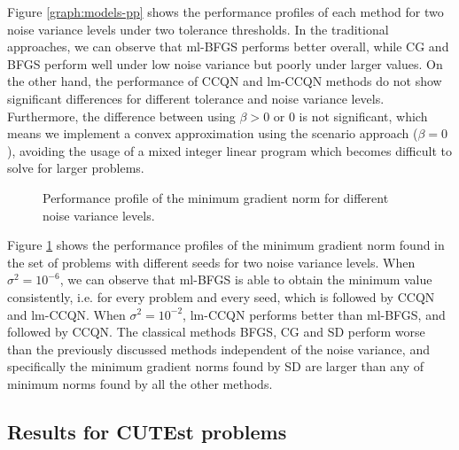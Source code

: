 \documentclass[11pt,twoside]{article}
\begin{document}
Figure \ref{graph:models-pp} shows the performance profiles of each method for two noise variance levels under two tolerance thresholds. In the traditional approaches, we can observe that ml-BFGS performs better overall, while CG and BFGS perform well under low noise variance but poorly under larger values. On the other hand, the performance of CCQN and lm-CCQN methods do not show significant differences for different tolerance and noise variance levels. Furthermore, the difference between using $\beta > 0$ or 0 is not significant, which means we implement a convex approximation using the scenario approach ($\beta=0$), avoiding the usage of a mixed integer linear program which  becomes difficult to solve for larger problems.


\captionsetup[subfigure]{labelformat=parens}
\begin{figure}[H]
                \centering
                \qquad
                \caption{Performance profile of the minimum gradient norm for different noise variance levels.}
                \label{graph:models-smallmin}
\end{figure}

Figure \ref{graph:models-smallmin} shows the performance profiles of the minimum gradient norm found in the set of problems with different seeds for two noise variance levels. When $\sigma^2=10^{-6}$, we can observe that ml-BFGS is able to obtain the minimum value consistently, i.e. for every problem and every seed, which is followed by CCQN and lm-CCQN. When $\sigma^2=10^{-2}$, lm-CCQN performs better than ml-BFGS, and followed by CCQN. The classical methods BFGS, CG and SD perform worse than the previously discussed methods independent of the noise variance, and specifically the minimum gradient norms found by SD are larger than any of minimum norms found by all the other methods.

\subsection{Results for CUTEst problems}\label{sec-qts}
\end{document}
